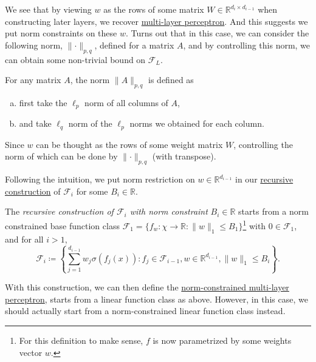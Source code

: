 We see that by viewing \(w\) as the rows of some matrix \(W \in \mathbb{R} ^{d_i \times d_{i-1} }\) when constructing later layers, we recover \hyperref[def:MLP]{multi-layer perceptron}. And this suggests we put norm constraints on these \(w\). Turns out that in this case, we can consider the following norm, \(\lVert \cdot \rVert _{p, q}\), defined for a matrix \(A\), and by controlling this norm, we can obtain some non-trivial bound on \(\mathscr{F} _L\).

\begin{definition}
	For any matrix \(A\), the norm \(\lVert A \rVert _{p, q}\) is defined as
	\begin{enumerate}[(a)]
		\item first take the \(\ell _p\) norm of all columns of \(A\),
		\item and take \(\ell _q\) norm of the \(\ell _p\) norms we obtained for each column.
	\end{enumerate}
\end{definition}

\begin{intuition}
	Since \(w\) can be thought as the rows of some weight matrix \(W\), controlling the norm of which can be done by \(\lVert \cdot \rVert _{p, q}\) (with transpose).
\end{intuition}

Following the intuition, we put norm restriction on \(w \in \mathbb{R} ^{d_{i-1}}\) in our \hyperref[def:recursive]{recursive construction} of \(\mathscr{F} _i\) for some \(B_i\in \mathbb{R} \).

\begin{definition}\label{def:norm-recursive}
	The \emph{recursive construction of \(\mathscr{F} _i\) with norm constraint} \(B_i \in \mathbb{R} \) starts from a norm constrained base function class \(\mathscr{F} _1 = \{ f_w \colon \chi \to \mathbb{R} \colon \lVert w \rVert _1 \leq B_1 \} \)\footnote{For this definition to make sense, \(f\) is now parametrized by some weights vector \(w\).} with \(0 \in \mathscr{F} _1\), and for all \(i > 1\),
	\[
		\mathscr{F} _i \coloneqq \left\{ \sum_{j=1}^{d_{i-1} } w_j \sigma (f_j(x)) \colon f_j \in \mathscr{F} _{i-1}, w \in \mathbb{R} ^{d_{i-1}} , \lVert w \rVert _1 \leq B_i\right\}.
	\]
\end{definition}

With this construction, we can then define the \hyperref[def:norm-MLP]{norm-constrained multi-layer perceptron}, starts from a linear function class as above. However, in this case, we should actually start from a norm-constrained linear function class instead.

